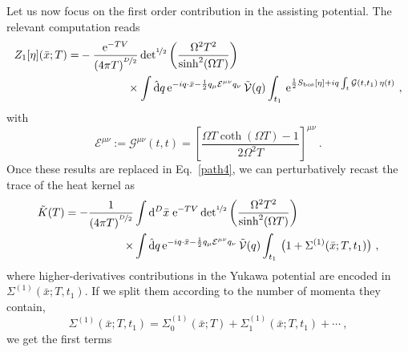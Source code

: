 \documentclass[12pt,a4paper]{article}
\numberwithin{equation}{section}
\numberwithin{equation}{section}
\begin{document}
Let us now focus on the first order contribution in the assisting potential. 
The relevant computation reads
\begin{align} \label{3.57}
\begin{split}
Z_1[\eta](\bar{x};T)=&- \frac{\mathrm{e}^{-TV}}{\left( 4\pi T \right)^{\nicefrac{D}{2}}} \, \mathrm{det}^{\nicefrac{1}{2}}\left( \frac{\Omega^2T^2}{\sinh^2(\Omega T)} \right)
\\
&\hspace{1.5cm}\times\int \hat{\rm d}q\,\mathrm{e}^{-i q \cdot \bar{x}-\frac12 q_\mu \mathcal{E}^{\mu\nu}q_\nu} \, \tilde{\mathcal{V}}(q) \int_{t_1} \, \mathrm{e}^{\frac12 S_{\mathrm{bos}}[\eta]+i q \int_t \mathcal{G}(t,t_1) \, \eta(t)}\ ,
\end{split}
\end{align}
with
\begin{equation} \label{EE}
\mathcal{E}^{\mu\nu}:=\mathcal{G}^{\mu\nu}(t,t)=\left[ \frac{\Omega T \coth{(\Omega T)}-1}{2\Omega^2 T}\right]^{\mu\nu}\ .
\end{equation}
Once these results are replaced in Eq.~\eqref{path4}, we can perturbatively recast the trace of the heat kernel as 
\begin{align}\label{eq:trace_HK_assisted_1order}
\begin{split} 
\tilde{K}(T)=-\frac{1}{\left( 4\pi T \right)^{\nicefrac{D}{2}}} &\int {\rm d}^D\bar{x} \; \mathrm{e}^{-TV} \, \mathrm{det}^{\nicefrac{1}{2}}\left( \frac{\Omega^2T^2}{\sinh^2(\Omega T)} \right)
\\
\times&\int \hat{\rm d}q\,\mathrm{e}^{-i q \cdot \bar{x}-\frac12 q_\mu \mathcal{E}^{\mu\nu}q_\nu} \, \tilde{\mathcal{V}}(q) \int_{t_1}
\, \big(1+ \Sigma^{(1)}(\bar{x};T,t_1)\big)\ ,
\end{split}
\end{align}
where higher-derivatives contributions in the Yukawa potential are encoded in $\Sigma^{(1)}(\bar{x};T,t_1)$.
If we split them according to the number of momenta they contain, 
\begin{equation} 
\Sigma^{(1)}(\bar{x};T,t_1)=\Sigma^{(1)}_0(\bar{x};T)+\Sigma^{(1)}_1(\bar{x};T,t_1)+\cdots \ ,
\end{equation}
we get the first terms
\end{document}
